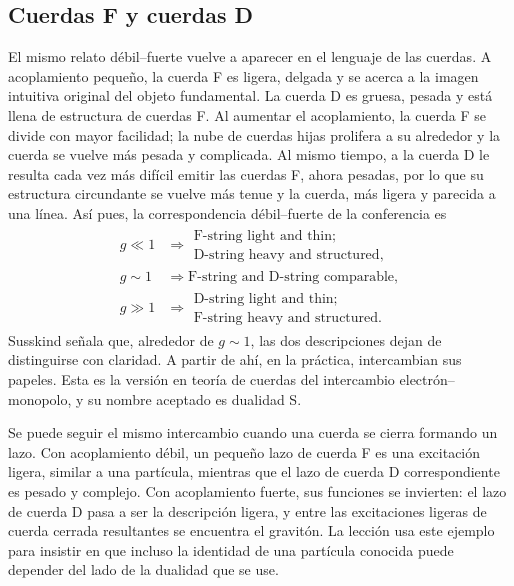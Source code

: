 \subsection{Cuerdas F y cuerdas D}

El mismo relato débil--fuerte vuelve a aparecer en el lenguaje de las cuerdas. A acoplamiento pequeño, la cuerda F es ligera, delgada y se acerca a la imagen intuitiva original del objeto fundamental. La cuerda D es gruesa, pesada y está llena de estructura de cuerdas F. Al aumentar el acoplamiento, la cuerda F se divide con mayor facilidad; la nube de cuerdas hijas prolifera a su alrededor y la cuerda se vuelve más pesada y complicada. Al mismo tiempo, a la cuerda D le resulta cada vez más difícil emitir las cuerdas F, ahora pesadas, por lo que su estructura circundante se vuelve más tenue y la cuerda, más ligera y parecida a una línea. Así pues, la correspondencia débil--fuerte de la conferencia es
\begin{align}
g \ll 1
&\Rightarrow
\begin{gathered}
\text{F-string light and thin;}\\
\text{D-string heavy and structured},
\end{gathered}\\
g \sim 1
&\Rightarrow
\text{F-string and D-string comparable},\\
g \gg 1
&\Rightarrow
\begin{gathered}
\text{D-string light and thin;}\\
\text{F-string heavy and structured}.
\end{gathered}
\end{align}
Susskind señala que, alrededor de \(g\sim 1\), las dos descripciones dejan de distinguirse con claridad. A partir de ahí, en la práctica, intercambian sus papeles. Esta es la versión en teoría de cuerdas del intercambio electrón--monopolo, y su nombre aceptado es dualidad S.

Se puede seguir el mismo intercambio cuando una cuerda se cierra formando un lazo. Con acoplamiento débil, un pequeño lazo de cuerda F es una excitación ligera, similar a una partícula, mientras que el lazo de cuerda D correspondiente es pesado y complejo. Con acoplamiento fuerte, sus funciones se invierten: el lazo de cuerda D pasa a ser la descripción ligera, y entre las excitaciones ligeras de cuerda cerrada resultantes se encuentra el gravitón. La lección usa este ejemplo para insistir en que incluso la identidad de una partícula conocida puede depender del lado de la dualidad que se use.

